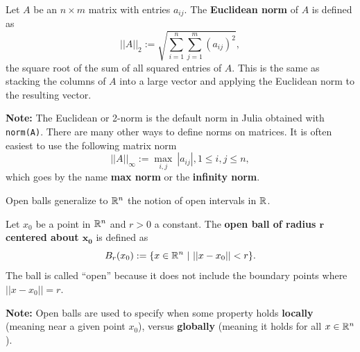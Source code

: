 \bigskip

\begin{tcolorbox}[colback=mylightblue, title = {\bf Norm of a Matrix}, breakable]



\begin{definition}
 Let $A$ be an $n\times m$ matrix with entries $a_{ij}$. The \textbf{Euclidean norm} of $A$ is defined as 
\begin{equation}
    \label{eq:EuclideanNormA}
   ||A||_2:= \sqrt{\sum_{i=1}^n \sum_{j=1}^{m} (a_{ij})^2},
\end{equation}
the square root of the sum of all squared entries of $A$. This is the same as stacking the columns of $A$ into a large vector and applying the Euclidean norm to the resulting vector. 
\end{definition}

\bigskip 

\textbf{Note:} The Euclidean or 2-norm is the default norm in Julia obtained with \texttt{norm(A)}. There are many other ways to define norms on matrices. It is often easiest to use the following matrix norm
\begin{equation}
    \label{eq:MaxNormA}
   ||A||_\infty:= \max_{i,j} ~|a_{ij}|, 1 \le i, j \le n,
\end{equation}
which goes by the name \textbf{max norm} or the \textbf{infinity norm}.

\end{tcolorbox}

\bigskip


\begin{tcolorbox}[colback=mylightblue, title = {\bf Open Ball of Radius r}, breakable]
Open balls generalize to $\mathbb R^n$ the notion of open intervals in $\mathbb R$.\\

\begin{definition}
Let $x_0$ be a point in $\mathbb R^n$ and $r>0$ a constant. The \textbf{open ball of radius $\bm{r}$ centered about $\bm{x_0}$} is defined as 
\begin{equation}
    \label{eq:OpenBallRadiusLittleR}
   B_r(x_0):=\{ x\in \mathbb R^n~|~ ||x-x_0|| < r \}.
\end{equation}
The ball is called ``open'' because it does not include the boundary points where $||x-x_0||=r.$ 
\end{definition}

\bigskip \textbf{Note:} Open balls are used to specify when some property holds \textbf{locally} (meaning near a given point $x_0$), versus \textbf{globally} (meaning it holds for all $x\in \mathbb R^n$).

\end{tcolorbox}

